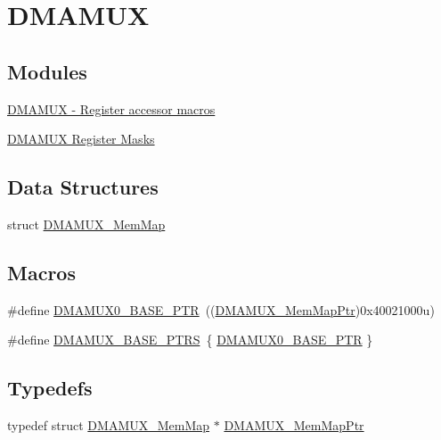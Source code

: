 \hypertarget{group___d_m_a_m_u_x___peripheral}{}\section{D\+M\+A\+M\+UX}
\label{group___d_m_a_m_u_x___peripheral}
\subsection*{Modules}
\begin{DoxyCompactItemize}
\item 
\hyperlink{group___d_m_a_m_u_x___register___accessor___macros}{D\+M\+A\+M\+U\+X -\/ Register accessor macros}
\item 
\hyperlink{group___d_m_a_m_u_x___register___masks}{D\+M\+A\+M\+U\+X Register Masks}
\end{DoxyCompactItemize}
\subsection*{Data Structures}
\begin{DoxyCompactItemize}
\item 
struct \hyperlink{struct_d_m_a_m_u_x___mem_map}{D\+M\+A\+M\+U\+X\+\_\+\+Mem\+Map}
\end{DoxyCompactItemize}
\subsection*{Macros}
\begin{DoxyCompactItemize}
\item 
\#define \hyperlink{group___d_m_a_m_u_x___peripheral_ga403b61d306820e4e1113c636300004a3}{D\+M\+A\+M\+U\+X0\+\_\+\+B\+A\+S\+E\+\_\+\+P\+TR}~((\hyperlink{group___d_m_a_m_u_x___peripheral_ga736ab5b1ed284b3b4fdb63010a576777}{D\+M\+A\+M\+U\+X\+\_\+\+Mem\+Map\+Ptr})0x40021000u)
\item 
\#define \hyperlink{group___d_m_a_m_u_x___peripheral_gaad218c12978071501dc2899f0624de4b}{D\+M\+A\+M\+U\+X\+\_\+\+B\+A\+S\+E\+\_\+\+P\+T\+RS}~\{ \hyperlink{group___d_m_a_m_u_x___peripheral_ga403b61d306820e4e1113c636300004a3}{D\+M\+A\+M\+U\+X0\+\_\+\+B\+A\+S\+E\+\_\+\+P\+TR} \}
\end{DoxyCompactItemize}
\subsection*{Typedefs}
\begin{DoxyCompactItemize}
\item 
typedef struct \hyperlink{struct_d_m_a_m_u_x___mem_map}{D\+M\+A\+M\+U\+X\+\_\+\+Mem\+Map} $\ast$ \hyperlink{group___d_m_a_m_u_x___peripheral_ga736ab5b1ed284b3b4fdb63010a576777}{D\+M\+A\+M\+U\+X\+\_\+\+Mem\+Map\+Ptr}
\end{DoxyCompactItemize}


